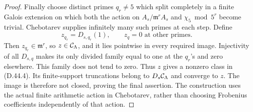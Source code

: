 \begin{proof}
Finally choose distinct primes \(q_r\ne5\)
which split completely in a finite Galois
extension on which both the action on
\(A_s/\mathfrak m^rA_s\) and
\(\chi_5\bmod5^r\) become trivial.
Chebotarev supplies infinitely many such
primes at each step. Define
\[
 z_{q_r}=D_{s,q_r}(1),\qquad z_q=0
                                  \text{ at other primes}.
\]
Then \(z_{q_r}\in\mathfrak m^r\), so
\(z\in{\cal C}_\Lambda\), and it lies
pointwise in every required image.
Injectivity of all \(D_{s,q}\) makes its
only divided family equal to one at
the \(q_r\)'s and zero elsewhere.
This family does not tend to zero.
Thus \(z\) gives a nonzero class in
(D.44.4). Its finite-support truncations
belong to \(D_s{\cal C}_\Lambda\) and
converge to \(z\). The image is therefore
not closed, proving the final assertion.
The construction uses the actual finite
arithmetic action in Chebotarev, rather
than choosing Frobenius coefficients
independently of that action.
\end{proof}

